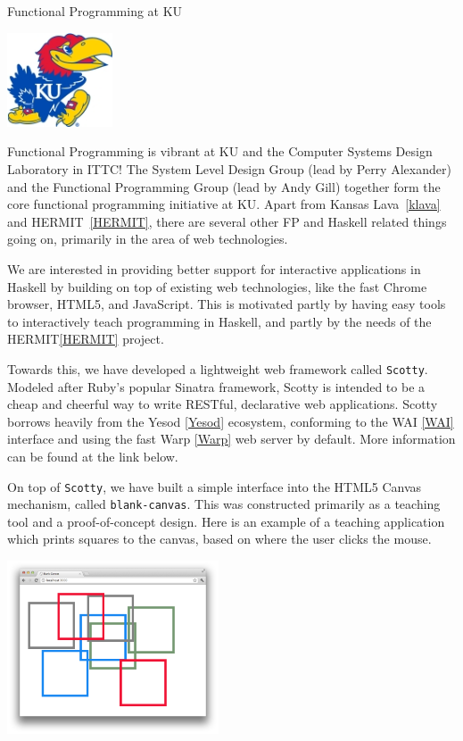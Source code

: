 \begin{hcarentry}[section]{Functional Programming at KU}
\label{ukansas}
\makeheader

\begin{center}
\includegraphics[width=0.235\textwidth]{html/jh2.jpg}
\end{center}

Functional Programming is vibrant at KU and 
the Computer Systems Design Laboratory in ITTC!
The System Level Design Group (lead by Perry Alexander)
and the Functional Programming Group (lead by Andy Gill)
together form the core functional programming initiative at KU.
Apart from Kansas Lava~\cref{klava} and HERMIT~\cref{HERMIT},
there are several other
FP and Haskell related things going on,
primarily in the area of web technologies.

We are interested in providing better support for
interactive applications in Haskell by building on top of existing web technologies,
like the fast Chrome browser, HTML5, and JavaScript. This is motivated
partly by having easy tools to interactively teach programming in Haskell,
and partly by the needs of the HERMIT\cref{HERMIT} project.

Towards this, we have developed a lightweight web framework called {\tt Scotty}.
Modeled after Ruby's popular Sinatra framework, Scotty is intended to
be a cheap and cheerful way to write RESTful, declarative web applications.
Scotty borrows heavily from the Yesod \cref{Yesod} ecosystem, conforming
to the WAI \cref{WAI} interface and using the fast Warp \cref{Warp} web server
by default. More information can be found at the link below.

On top of {\tt Scotty}, we have built a simple interface
into the HTML5 Canvas mechanism, called {\tt blank-canvas}.
This was constructed primarily as a teaching tool and
a proof-of-concept design. Here is an example of
a teaching application which prints squares to the canvas,
based on where the user clicks the mouse.

\includegraphics[width=0.47\textwidth]{html/squares.png}


\end{hcarentry}
